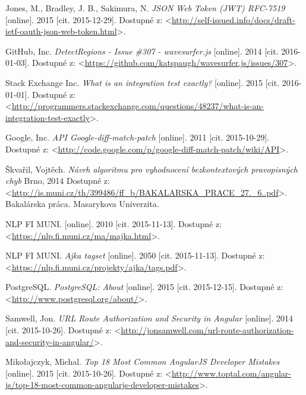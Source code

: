 \documentclass[12pt,oneside]{fithesis2}
\begin{document}
\begin{thebibliography}{59}
  		Jones, M., Bradley, J. B., Sakimura, N.
  		\emph{JSON Web Token (JWT) RFC-7519}
  		[online].
  		2015
  		[cit. 2015-12-29].
  		Dostupné z: <\url{http://self-issued.info/docs/draft-ietf-oauth-json-web-token.html}>.  		
  		
  		GitHub, Inc.
  		\emph{DetectRegions - Issue \#307 - wavesurfer.js}
  		[online].
  		2014
  		[cit. 2016-01-03].
  		Dostupné z: <\url{https://github.com/katspaugh/wavesurfer.js/issues/307}>.
  		
  		Stack Exchange Inc.
  		\emph{What is an integration test exactly?}
  		[online].
  		2015
  		[cit. 2016-01-01].
  		Dostupné z: <\url{http://programmers.stackexchange.com/questions/48237/what-is-an-integration-test-exactly}>.
  		
  		Google, Inc.
  		\emph{API Google-diff-match-patch}
  		[online].
  		2011
  		[cit. 2015-10-29].
  		Dostupné z: <\url{http://code.google.com/p/google-diff-match-patch/wiki/API}>.  		
  		
  		Škvařil, Vojtěch.
  		\emph{Návrh algoritmu pro vyhodnocení bezkontextových pravopisných chyb}
  		Brno, 
  		2014
  		Dostupné z: <\url{http://is.muni.cz/th/399486/ff_b/BAKALARSKA_PRACE_27._6..pdf}>.
  		Bakalárska práca. Masarykova Univerzita.
  		
		NLP FI MUNI.
		[online].
  		2010
  		[cit. 2015-11-13].
  		Dostupné z: <\url{https://nlp.fi.muni.cz/ma/majka.html}>.
  		
  		NLP FI MUNI.
  		\emph{Ajka tagset}
  		[online].
  		2050
  		[cit. 2015-11-13].
  		Dostupné z: <\url{https://nlp.fi.muni.cz/projekty/ajka/tags.pdf}>.
  		
  		PostgreSQL.
  		\emph{PostgreSQL: About}
  		[online].
  		2015
  		[cit. 2015-12-15].
  		Dostupné z: <\url{http://www.postgresql.org/about/}>.
  		
  		Samwell, Jon.
  		\emph{URL Route Authorization and Security in Angular}
  		[online].
  		2014
  		[cit. 2015-10-26].
  		Dostupné z: <\url{http://jonsamwell.com/url-route-authorization-and-security-in-angular/}>.
  		
  		Mikołajczyk, Michal.
  		\emph{Top 18 Most Common AngularJS Developer Mistakes}
  		[online].
  		2015
  		[cit. 2015-10-26].
  		Dostupné z: <\url{http://www.toptal.com/angular-js/top-18-most-common-angularjs-developer-mistakes}>.		
  		  			
\end{thebibliography} 
	
\end{document}
